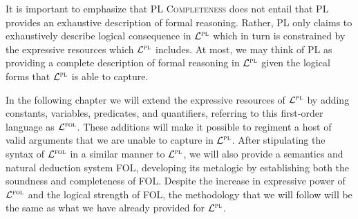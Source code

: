 

It is important to emphasize that \textsc{PL Completeness} does not entail that PL provides an exhaustive description of formal reasoning.
Rather, PL only claims to exhaustively describe logical consequence in $\mathcal{L}^{\textsc{pl}}$ which in turn is constrained by the expressive resources which $\mathcal{L}^{\textsc{pl}}$ includes.
At most, we may think of PL as providing a complete description of formal reasoning in $\mathcal{L}^{\textsc{pl}}$ given the logical forms that $\mathcal{L}^{\textsc{pl}}$ is able to capture.

In the following chapter we will extend the expressive resources of $\mathcal{L}^{\textsc{pl}}$ by adding constants, variables, predicates, and quantifiers, referring to this first-order language as $\mathcal{L}^{\textsc{fol}}$.
These additions will make it possible to regiment a host of valid arguments that we are unable to capture in $\mathcal{L}^{\textsc{pl}}$.
After stipulating the syntax of $\mathcal{L}^{\textsc{fol}}$ in a similar manner to $\mathcal{L}^{\textsc{pl}}$, we will also provide a semantics and natural deduction system FOL, developing its metalogic by establishing both the soundness and completeness of FOL.
Despite the increase in expressive power of $\mathcal{L}^{\textsc{fol}}$ and the logical strength of FOL, the methodology that we will follow will be the same as what we have already provided for $\mathcal{L}^{\textsc{pl}}$.




\iffalse

\practiceproblems

